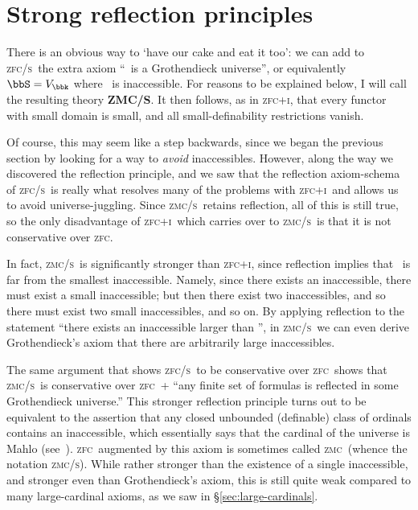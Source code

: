 \documentclass[12pt]{amsart}
\def\zfc{\textsc{zfc}}
\def\zfci{\textsc{zfc+i}}
\def\zfcs{\textsc{zfc/s}}
\def\zmc{\textsc{zmc}}
\def\zmcs{\textsc{zmc/s}}
\begin{document}
\section{Strong reflection principles}
\label{sec:strong-reflect}

There is an obvious way to `have our cake and eat it too': we can add
to \zfcs\ the extra axiom ``\bbS\ is a Grothendieck universe'', or
equivalently $\bbS=V_\bbk$ where \bbk\ is inaccessible.  For reasons
to be explained below, I will call the resulting theory
\textbf{ZMC/S}.  It then follows, as in \zfci, that every functor with
small domain is small, and all small-definability restrictions vanish.

Of course, this may seem like a step backwards, since we began the
previous section by looking for a way to \emph{avoid} inaccessibles.
However, along the way we discovered the reflection principle, and we
saw that the reflection axiom-schema of \zfcs\ is really what resolves
many of the problems with \zfci\ and allows us to avoid
universe-juggling.  Since \zmcs\ retains reflection, all of this is
still true, so the only disadvantage of \zfci\ which carries over to
\zmcs\ is that it is not conservative over \zfc.

In fact, \zmcs\ is significantly stronger than \zfci, since reflection
implies that \bbk\ is far from the smallest inaccessible.  Namely,
since there exists an inaccessible, there must exist a small
inaccessible; but then there exist two inaccessibles, and so there
must exist two small inaccessibles, and so on.  By applying reflection
to the statement ``there exists an inaccessible larger than \al'', in
\zmcs\ we can even derive Grothendieck's axiom that there are
arbitrarily large inaccessibles.

The same argument that shows \zfcs\ to be conservative over \zfc\
shows that \zmcs\ is conservative over \zfc\ + ``any finite set of
formulas is reflected in some Grothendieck universe.''  This stronger
reflection principle turns out to be equivalent to the assertion that
any closed unbounded (definable) class of ordinals contains an
inaccessible, which essentially says that the cardinal of the universe
is Mahlo (see~\cite{levy:strong-inf}).  \zfc\ augmented by this axiom
is sometimes called \zmc\ (whence the notation \zmcs).  While rather
stronger than the existence of a single inaccessible, and stronger
even than Grothendieck's axiom, this is still quite weak compared to
many large-cardinal axioms, as we saw in \S\ref{sec:large-cardinals}.
\end{document}

